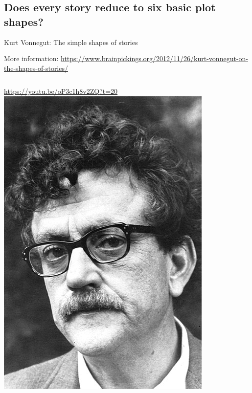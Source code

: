 \documentclass[aspectratio=169,usenames,dvipsnames]{beamer}
\begin{document}
\subsection{Does every story reduce to six basic plot shapes?}
\begin{frame}{Kurt Vonnegut: The simple shapes of stories}
    \begin{reference}
        More information:
        \url{https://www.brainpickings.org/2012/11/26/kurt-vonnegut-on-the-shapes-of-stories/}
    \end{reference}
    \begin{columns}
    \centering\large
    \url{https://youtu.be/oP3c1h8v2ZQ?t=20}
        \centering
        \includegraphics[height=0.6\textheight]{fig/vonnegut}
    \end{columns}
\end{frame}
\end{document}
